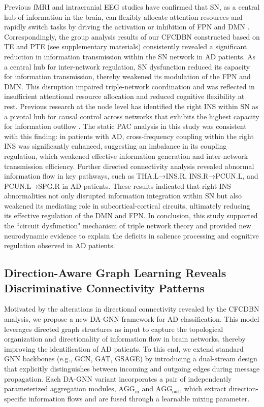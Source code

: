 \documentclass[lettersize,journal]{IEEEtran}
\begin{document}
Previous fMRI and intracranial EEG studies have confirmed that SN, as a central hub of information in the brain, can flexibly allocate attention resources and rapidly switch tasks by driving the activation or inhibition of FPN and DMN  \cite{das2020spatiotemporal,das2024electrophysiological,cai2021dynamic,menon2010saliency}. Correspondingly, the group analysis results of our CFCDBN constructed based on TE and PTE (see supplementary materials) consistently revealed a significant reduction in information transmission within the SN network in AD patients. As a central hub for inter-network regulation, SN dysfunction reduced its capacity for information transmission, thereby weakened its modulation of the FPN and DMN. This disruption impaired triple-network coordination and was reflected in insufficient attentional resource allocation and reduced cognitive flexibility at rest. Previous research at the node level has identified the right INS within SN as a pivotal hub for causal control across networks that exhibits the highest capacity for information outflow  \cite{das2020spatiotemporal,das2024electrophysiological,cai2021dynamic,menon2010saliency,cai2016causal}. 
The static PAC analysis in this study was consistent with this finding: in patients with AD, cross-frequency coupling within the right INS was significantly enhanced, suggesting an imbalance in its coupling regulation, which weakened effective information generation and inter-network transmission efficiency. Further directed connectivity analysis revealed abnormal information flow in key pathways, such as THA.L→INS.R, INS.R→PCUN.L, and PCUN.L→SPG.R in AD patients. These results indicated that right INS abnormalities not only disrupted information integration within SN but also weakened its mediating role in subcortical-cortical circuits, ultimately reducing its effective regulation of the DMN and FPN. In conclusion, this study supported the ``circuit dysfunction" mechanism of triple network theory and provided new neurodynamic evidence to explain the deficits in salience processing and cognitive regulation observed in AD patients.

\subsection{Direction-Aware Graph Learning Reveals Discriminative Connectivity Patterns}

Motivated by the alterations in directional connectivity revealed by the CFCDBN analysis, we propose a new DA-GNN framework for AD classification. 
This model leverages directed graph structures as input to capture the topological organization and directionality of information flow in brain networks, thereby improving the identification of AD patients.
To this end, we extend standard GNN backbones (e.g., GCN, GAT, GSAGE) by introducing a dual-stream design that explicitly distinguishes between incoming and outgoing edges during message propagation. 
Each DA-GNN variant incorporates a pair of independently parameterized aggregation modules, \(\text{AGG}_{\text{in}}\) and \(\text{AGG}_{\text{out}}\), which extract direction-specific information flows and are fused through a learnable mixing parameter.
\end{document}
